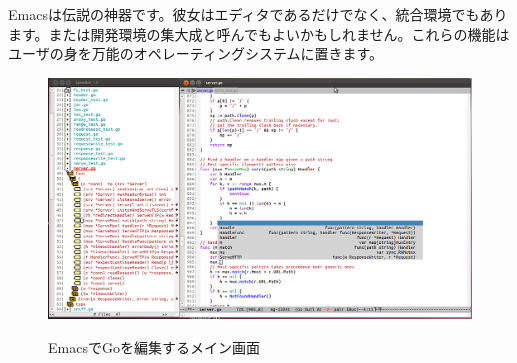 Emacsは伝説の神器です。彼女はエディタであるだけでなく、統合環境でもあります。または開発環境の集大成と呼んでもよいかもしれません。これらの機能はユーザの身を万能のオペレーティングシステムに置きます。

\begin{figure}[H]
  \includegraphics[width=14cm]{1.4.emacs.png}
   \label{図1.10}
   \caption{EmacsでGoを編集するメイン画面}
\end{figure}


